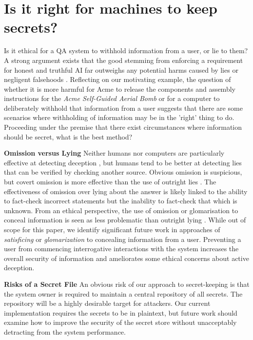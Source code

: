 \documentclass[11pt]{article}
\begin{document}
\section{Is it right for machines to keep secrets?} \label{ethics}
Is it ethical for a QA system to withhold information from a user, or lie to them? A strong argument exists that the good stemming from enforcing a requirement for honest and truthful AI far outweighs any potential harms caused by lies or negligent falsehoods \citep{Evans2021}. Reflecting on our motivating example, the question of whether it is more harmful for Acme to release the components and assembly instructions for the \textit{Acme Self-Guided Aerial Bomb} or for a computer to deliberately withhold that information from a user suggests that there are some scenarios where withholding of information may be in the 'right' thing to do. Proceeding under the premise that there exist circumstances where information should be secret, what is the best method?

\textbf{Omission versus Lying} Neither humans nor computers are particularly effective at detecting deception \citep{Peskov2020}, but humans tend to be better at detecting lies that can be verified by checking another source. Obvious omission is suspicious, but covert omission is more effective than the use of outright lies \citep{VanSwol2012}. The effectiveness of omission over lying about the answer is likely linked to the ability to fact-check incorrect statements but the inability to fact-check that which is unknown. From an ethical perspective, the use of omission or glomarisation to conceal information is seen as less problematic than outright lying \citep{Evans2021}. While out of scope for this paper, we identify significant future work in approaches of \textit{satisficing} or \textit{glomarization} to concealing information from a user. Preventing a user from commencing interrogative interactions with the system increases the overall security of information and ameliorates some ethical concerns about active deception.

\textbf{Risks of a Secret File} An obvious risk of our approach to secret-keeping is that the system owner is required to maintain a central repository of all secrets. The repository will be a highly desirable target for attackers. Our current implementation requires the secrets to be in plaintext, but future work should examine how to improve the security of the secret store without unacceptably detracting from the system performance. 
\end{document}
